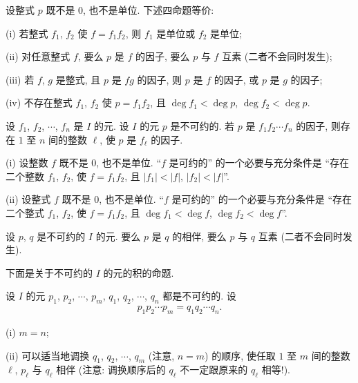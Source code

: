 \begin{proposition}
    设整式 $p$ 既不是 $0$, 也不是单位. 下述四命题等价:

    (i) 若整式 $f_1$, $f_2$ 使 $f = f_1 f_2$, 则 $f_1$ 是单位或 $f_2$ 是单位;

    (ii) 对任意整式 $f$, 要么 $p$ 是 $f$ 的因子, 要么 $p$ 与 $f$ 互素 (二者不会同时发生);

    (iii) 若 $f$, $g$ 是整式, 且 $p$ 是 $fg$ 的因子, 则 $p$ 是 $f$ 的因子, 或 $p$ 是 $g$ 的因子;

    (iv) 不存在整式 $f_1$, $f_2$ 使 $p = f_1 f_2$, 且 $\deg f_1 < \deg p$, $\deg f_2 < \deg p$.
\end{proposition}

\begin{proposition}
    设 $f_1$, $f_2$, $\cdots$, $f_n$ 是 $I$ 的元. 设 $I$ 的元 $p$ 是不可约的. 若 $p$ 是 $f_1 f_2 \cdots f_n$ 的因子, 则存在 $1$ 至 $n$ 间的整数 $\ell$, 使 $p$ 是 $f_{\ell}$ 的因子.
\end{proposition}

\begin{proposition}
    (i) 设整数 $f$ 既不是 $0$, 也不是单位. ``$f$ 是可约的'' 的一个必要与充分条件是 ``存在二个整数 $f_1$, $f_2$, 使 $f = f_1 f_2$, 且 $|f_1| < |f|$, $|f_2| < |f|$''.

    (ii) 设整式 $f$ 既不是 $0$, 也不是单位. ``$f$ 是可约的'' 的一个必要与充分条件是 ``存在二个整式 $f_1$, $f_2$, 使 $f = f_1 f_2$, 且 $\deg f_1 < \deg f$, $\deg f_2 < \deg f$''.
\end{proposition}

\begin{proposition}
    设 $p$, $q$ 是不可约的 $I$ 的元. 要么 $p$ 是 $q$ 的相伴, 要么 $p$ 与 $q$ 互素 (二者不会同时发生).
\end{proposition}

下面是关于不可约的 $I$ 的元的积的命题.

\begin{proposition}
    设 $I$ 的元 $p_1$, $p_2$, $\cdots$, $p_m$, $q_1$, $q_2$, $\cdots$, $q_n$ 都是不可约的. 设
    \begin{align*}
        p_1 p_2 \cdots p_m = q_1 q_2 \cdots q_n.
    \end{align*}

    (i) $m = n$;

    (ii) 可以适当地调换 $q_1$, $q_2$, $\cdots$, $q_m$ (注意, $n = m$) 的顺序, 使任取 $1$ 至 $m$ 间的整数 $\ell$, $p_{\ell}$ 与 $q_{\ell}$ 相伴 (注意: 调换顺序后的 $q_{\ell}$ 不一定跟原来的 $q_{\ell}$ 相等!).
\end{proposition}

